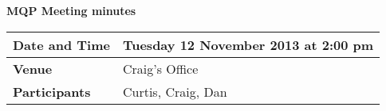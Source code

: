 \documentclass[a4wide,10pt]{extarticle}
\begin{document}
\thispagestyle{empty}

\begin{center}
\textbf{MQP Meeting minutes}
\vspace{0.33cm}
\end{center}

\begin{center}
\begin{tabular}{| m{2.8cm} | m{13.6cm} |} \hline
\textbf{Date and Time} & Tuesday 12 November 2013 at 2:00 pm \\ \hline
\textbf{Venue} & Craig's Office \\ \hline
\textbf{Participants} & Curtis, Craig, Dan\\ \hline
\end{tabular}
\end{center}
\end{document}
